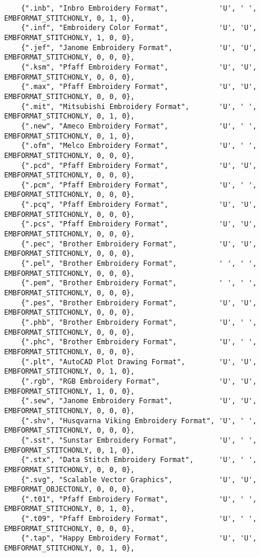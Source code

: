 \begin{lstlisting}
    {".inb", "Inbro Embroidery Format",            'U', ' ', EMBFORMAT_STITCHONLY, 0, 1, 0},
    {".inf", "Embroidery Color Format",            'U', 'U', EMBFORMAT_STITCHONLY, 1, 0, 0},
    {".jef", "Janome Embroidery Format",           'U', 'U', EMBFORMAT_STITCHONLY, 0, 0, 0},
    {".ksm", "Pfaff Embroidery Format",            'U', 'U', EMBFORMAT_STITCHONLY, 0, 0, 0},
    {".max", "Pfaff Embroidery Format",            'U', 'U', EMBFORMAT_STITCHONLY, 0, 0, 0},
    {".mit", "Mitsubishi Embroidery Format",       'U', ' ', EMBFORMAT_STITCHONLY, 0, 1, 0},
    {".new", "Ameco Embroidery Format",            'U', ' ', EMBFORMAT_STITCHONLY, 0, 1, 0},
    {".ofm", "Melco Embroidery Format",            'U', ' ', EMBFORMAT_STITCHONLY, 0, 0, 0},
    {".pcd", "Pfaff Embroidery Format",            'U', 'U', EMBFORMAT_STITCHONLY, 0, 0, 0},
    {".pcm", "Pfaff Embroidery Format",            'U', ' ', EMBFORMAT_STITCHONLY, 0, 0, 0},
    {".pcq", "Pfaff Embroidery Format",            'U', 'U', EMBFORMAT_STITCHONLY, 0, 0, 0},
    {".pcs", "Pfaff Embroidery Format",            'U', 'U', EMBFORMAT_STITCHONLY, 0, 0, 0},
    {".pec", "Brother Embroidery Format",          'U', 'U', EMBFORMAT_STITCHONLY, 0, 0, 0},
    {".pel", "Brother Embroidery Format",          ' ', ' ', EMBFORMAT_STITCHONLY, 0, 0, 0},
    {".pem", "Brother Embroidery Format",          ' ', ' ', EMBFORMAT_STITCHONLY, 0, 0, 0},
    {".pes", "Brother Embroidery Format",          'U', 'U', EMBFORMAT_STITCHONLY, 0, 0, 0},
    {".phb", "Brother Embroidery Format",          'U', ' ', EMBFORMAT_STITCHONLY, 0, 0, 0},
    {".phc", "Brother Embroidery Format",          'U', ' ', EMBFORMAT_STITCHONLY, 0, 0, 0},
    {".plt", "AutoCAD Plot Drawing Format",        'U', 'U', EMBFORMAT_STITCHONLY, 0, 1, 0},
    {".rgb", "RGB Embroidery Format",              'U', 'U', EMBFORMAT_STITCHONLY, 1, 0, 0},
    {".sew", "Janome Embroidery Format",           'U', 'U', EMBFORMAT_STITCHONLY, 0, 0, 0},
    {".shv", "Husqvarna Viking Embroidery Format", 'U', ' ', EMBFORMAT_STITCHONLY, 0, 0, 0},
    {".sst", "Sunstar Embroidery Format",          'U', ' ', EMBFORMAT_STITCHONLY, 0, 1, 0},
    {".stx", "Data Stitch Embroidery Format",      'U', ' ', EMBFORMAT_STITCHONLY, 0, 0, 0},
    {".svg", "Scalable Vector Graphics",           'U', 'U', EMBFORMAT_OBJECTONLY, 0, 0, 0},
    {".t01", "Pfaff Embroidery Format",            'U', ' ', EMBFORMAT_STITCHONLY, 0, 1, 0},
    {".t09", "Pfaff Embroidery Format",            'U', ' ', EMBFORMAT_STITCHONLY, 0, 0, 0},
    {".tap", "Happy Embroidery Format",            'U', 'U', EMBFORMAT_STITCHONLY, 0, 1, 0},

\end{lstlisting}
